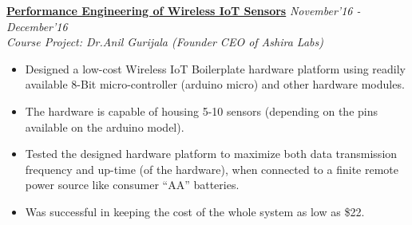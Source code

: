 \documentclass[10pt]{article}
\newenvironment{changemargin}[2]{%
    \begin{list}{}{%
            \setlength{\topsep}{0pt}%
            \setlength{\leftmargin}{#1}%
            \setlength{\rightmargin}{#2}%
            \setlength{\listparindent}{\parindent}%
        \setlength{\itemindent}{\parindent}%
            \setlength{\parsep}{\parskip}%
        }%
\item[]}{\end{list}
}
\newenvironment{body} {
    \vspace*{-16pt}
    \begin{changemargin}{-0.6in}{-0.65in}
    }     
    {\end{changemargin}
}
\begin{document}
 \begin{body}
     \vspace{14pt}
    

    \href{https://researchweb.iiit.ac.in/~shaleen.garg/files/Perf_engg_project.pdf}{\textbf{Performance Engineering of Wireless IoT Sensors}} \hfill \emph{November'16 - December'16}\\
    \emph{Course Project: Dr.Anil Gurijala (Founder CEO of Ashira Labs)}
    \begin{itemize}
        \item{Designed a low-cost Wireless IoT Boilerplate hardware platform using readily available 8-Bit micro-controller (arduino micro) and other hardware modules.}
        \item{The hardware is capable of housing 5-10 sensors (depending on the pins available on the arduino model).}
        \item{Tested the designed hardware platform to maximize both data transmission frequency and up-time (of the hardware), when connected to a finite remote power source like consumer ``AA'' batteries.}
        \item{Was successful in keeping the cost of the whole system as low as \$22.}
    \end{itemize}


\end{body}
\end{document}
